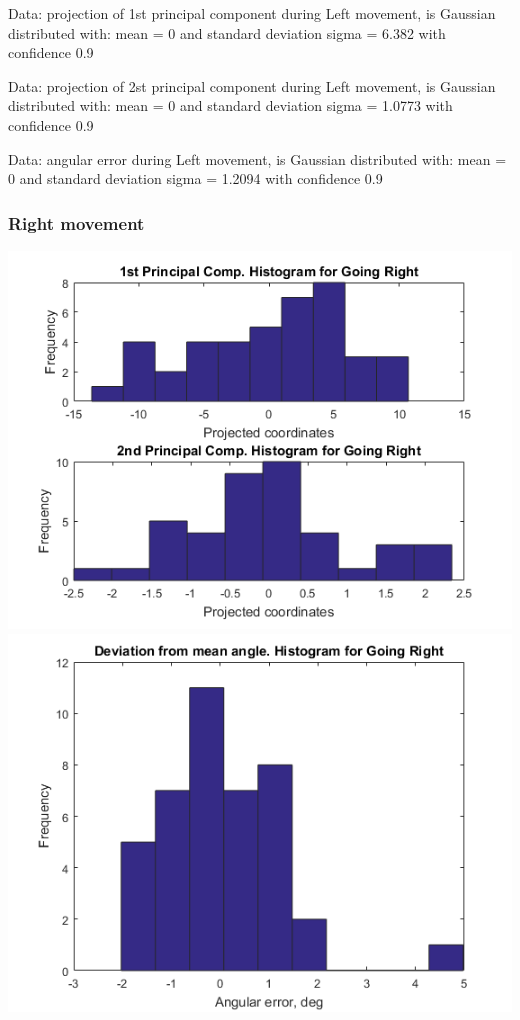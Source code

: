 \documentclass[a4paper, 12pt]{article}
\begin{document}
Data: projection of 1st principal component during  Left movement, is Gaussian distributed with: mean = 0 and standard deviation sigma = 6.382 with confidence 0.9%





\smallskip

Data: projection of 2st principal component during  Left movement, is Gaussian distributed with: mean = 0 and standard deviation sigma = 1.0773 with confidence 0.9%





\smallskip


Data: angular error during   Left movement, is Gaussian distributed with: mean = 0 and standard deviation sigma = 1.2094 with confidence 0.9%

\newpage
\subsubsection{Right movement}

\begin{center}
  \includegraphics[scale=0.6]{rr2}
  \includegraphics[scale=0.6]{rr3}
\end{center}
\end{document}
